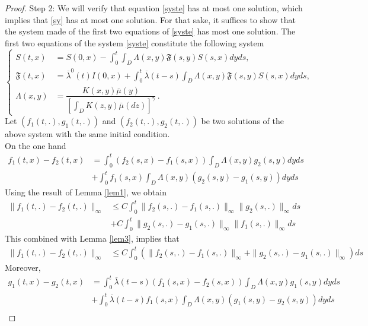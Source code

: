 \documentclass[10pt,a4paper]{amsart}
\begin{document}
\begin{proof}
Step 2: We will verify that  equation \eqref{syste} has at most one solution, which implies that \eqref{sy} has at most one solution.  For that sake, it suffices to show that the system made of the first two equations of \eqref{syste}  has most one solution. The first two equations of the system \eqref{syste} constitute the following system
	\begin{equation}
	\label{sys}
	\left\lbrace
	\begin{aligned}
		S(t,x)&= S(0,x)- \int_0^t\int_{D} \Lambda(x,y)\mathfrak{F}(s,y)S(s,x)dyds,\\
	\mathfrak{F}(t,x) &=\overline{\lambda}^0(t)I(0,x)+\int_0^t\overline{\lambda}(t-s)\int_{D} \Lambda(x,y)\mathfrak{F}(s,y)S(s,x)dyds,\\
 \Lambda(x,y)&=\dfrac{K(x,y)\overline{\mu}(y)}{\left[\displaystyle\int_{D}K(z,y)\overline{\mu}(dz) \right]^{\gamma}}\,.
	\end{aligned}
	\right.
	\end{equation}
	Let $\left(f_1(t,.), g_1(t,.)\right)$ and $\left(f_2(t,.), g_2(t,.)\right)$ be two solutions of the above system with the same initial condition.\\
	On the one hand	
	\begin{align}
	f_1(t,x)-f_2(t,x)&= \int_0^t  \left(f_2(s,x)-f_1(s,x)\right)\int_{D}\Lambda(x,y)g_2(s,y)dyds\nonumber\\
	&+\int_0^tf_1(s,x)\int_{D}\Lambda(x,y)\left( g_2(s,y)-g_1(s,y)\right)dyds\nonumber
	\end{align}
Using the result of Lemma \ref{lem1}, we obtain
	\begin{align}
	\|f_1(t,.)-f_2(t,.)\|_{\infty}&\leq C\int_0^t \|f_2(s,.)-f_1(s,.)\|_{\infty}\|g_2(s,.)\|_{\infty}ds\nonumber\\
	&+ C\int_0^t\| g_2(s,.)-g_1(s,.)\|_{\infty} \|f_1(s,.)\|_{\infty}ds\nonumber
	\end{align}
This combined with Lemma \ref{lem3}, implies that
	\begin{align}
	\label{equa5}
	\|f_1(t,.)-f_2(t,.)\|_{\infty}&\leq C\int_0^t \left(\|f_2(s,.)-f_1(s,.)\|_{\infty}+\| g_2(s,.)-g_1(s,.)\|_{\infty}\right) ds
	\end{align}
	Moreover,
	\begin{align}
	g_1(t,x)-g_2(t,x)&=\int_0^t\overline{\lambda}(t-s) (f_1(s,x)-f_2(s,x))\int_{D}\Lambda(x,y)g_1(s,y)dyds\nonumber\\
	&+\int_0^t \overline{\lambda}(t-s)f_1(s,x)\int_{D}\Lambda(x,y) (g_1(s,y)-g_2(s,y))dyds\nonumber\\

\end{align}
\end{proof}
\end{document}
